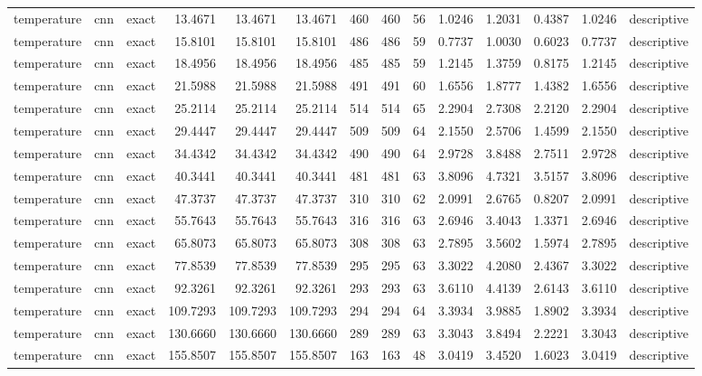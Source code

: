 \begin{tabular}{lllrrrrrrrrrrl}
temperature & cnn & exact & 13.4671 & 13.4671 & 13.4671 & 460 & 460 & 56 & 1.0246 & 1.2031 & 0.4387 & 1.0246 & descriptive \\
temperature & cnn & exact & 15.8101 & 15.8101 & 15.8101 & 486 & 486 & 59 & 0.7737 & 1.0030 & 0.6023 & 0.7737 & descriptive \\
temperature & cnn & exact & 18.4956 & 18.4956 & 18.4956 & 485 & 485 & 59 & 1.2145 & 1.3759 & 0.8175 & 1.2145 & descriptive \\
temperature & cnn & exact & 21.5988 & 21.5988 & 21.5988 & 491 & 491 & 60 & 1.6556 & 1.8777 & 1.4382 & 1.6556 & descriptive \\
temperature & cnn & exact & 25.2114 & 25.2114 & 25.2114 & 514 & 514 & 65 & 2.2904 & 2.7308 & 2.2120 & 2.2904 & descriptive \\
temperature & cnn & exact & 29.4447 & 29.4447 & 29.4447 & 509 & 509 & 64 & 2.1550 & 2.5706 & 1.4599 & 2.1550 & descriptive \\
temperature & cnn & exact & 34.4342 & 34.4342 & 34.4342 & 490 & 490 & 64 & 2.9728 & 3.8488 & 2.7511 & 2.9728 & descriptive \\
temperature & cnn & exact & 40.3441 & 40.3441 & 40.3441 & 481 & 481 & 63 & 3.8096 & 4.7321 & 3.5157 & 3.8096 & descriptive \\
temperature & cnn & exact & 47.3737 & 47.3737 & 47.3737 & 310 & 310 & 62 & 2.0991 & 2.6765 & 0.8207 & 2.0991 & descriptive \\
temperature & cnn & exact & 55.7643 & 55.7643 & 55.7643 & 316 & 316 & 63 & 2.6946 & 3.4043 & 1.3371 & 2.6946 & descriptive \\
temperature & cnn & exact & 65.8073 & 65.8073 & 65.8073 & 308 & 308 & 63 & 2.7895 & 3.5602 & 1.5974 & 2.7895 & descriptive \\
temperature & cnn & exact & 77.8539 & 77.8539 & 77.8539 & 295 & 295 & 63 & 3.3022 & 4.2080 & 2.4367 & 3.3022 & descriptive \\
temperature & cnn & exact & 92.3261 & 92.3261 & 92.3261 & 293 & 293 & 63 & 3.6110 & 4.4139 & 2.6143 & 3.6110 & descriptive \\
temperature & cnn & exact & 109.7293 & 109.7293 & 109.7293 & 294 & 294 & 64 & 3.3934 & 3.9885 & 1.8902 & 3.3934 & descriptive \\
temperature & cnn & exact & 130.6660 & 130.6660 & 130.6660 & 289 & 289 & 63 & 3.3043 & 3.8494 & 2.2221 & 3.3043 & descriptive \\
temperature & cnn & exact & 155.8507 & 155.8507 & 155.8507 & 163 & 163 & 48 & 3.0419 & 3.4520 & 1.6023 & 3.0419 & descriptive \\

\end{tabular}
